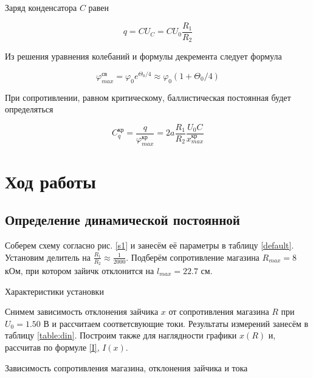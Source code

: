 \documentclass[12pt,a4paper]{article}
\begin{document}
	 
	 Заряд конденсатора $ C $ равен 
	 
	 \begin{equation}\label{}
	    q = C U_C  = C U_0 \dfrac{R_1}{R_2}
	 \end{equation}
	 
	 Из решения уравнения колебаний и формулы декремента следует формула 
	 
	 \begin{equation}\label{eq:bal}
	 \varphi_{max}^\text{св} = \varphi_0 e^{\Theta_0/4} \approx \varphi_0 \left(1+\Theta_0/4\right)
	 \end{equation}
	 
	 При сопротивлении, равном критическому, баллистическая постоянная будет определяться
	 
	 \begin{equation}
	 C_{q}^\text{кр} = \dfrac{q}{\varphi_{max}^\text{кр}} = 2a\dfrac{R_1}{R_2}\dfrac{U_0C}{x_{max}^\text{кр}}
	 \label{C}
	 \end{equation}


\section*{Ход работы}

\subsection*{Определение динамической постоянной}

Соберем схему согласно рис. \ref{s1} и занесём её параметры в таблицу \ref{default}. Установим делитель на $\frac{R_1}{R_2} \approx \frac{1}{2000}$. Подберём сопротивление магазина $R_{max} = 8$ кОм, при котором зайичк отклонится на $l_{max} = 22.7$ см. 

\begin{table}[H]
	\caption{Характеристики установки}
	
	\label{default}
\end{table}

Снимем зависимость отклонения зайчика $x$ от сопротивления магазина $R$ при $U_0=1.50$ В и рассчитаем соответсвующие токи. Результаты измерений занесём в таблицу \ref{table:din}. Построим также для наглядности графики $x(R)$ и, рассчитав по формуле \ref{I}, $I(x)$.

\begin{table}[H]
	\caption{Зависимость сопротивления магазина, отклонения зайчика и тока}
	
		\label{table:din}
\end{table}
\end{document}
